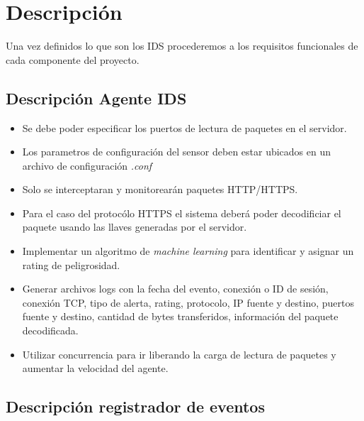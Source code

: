 \section{Descripción}

Una vez definidos lo que son los IDS procederemos a los requisitos funcionales de cada componente del proyecto. \\

\subsection{Descripción Agente IDS}


\begin{itemize}
    \item Se debe poder especificar los puertos de lectura de paquetes en el servidor.
    \item Los parametros de configuración del sensor deben estar ubicados en un archivo de configuración \textit{.conf}
    \item Solo se interceptaran y monitorearán paquetes HTTP/HTTPS.
    \item Para el caso del protocólo HTTPS el sistema deberá poder decodificiar el paquete usando las llaves generadas por el servidor.
    \item Implementar un algoritmo de \textit{machine learning} para identificar y asignar un rating de peligrosidad.
    \item Generar archivos logs con la fecha del evento, conexión o ID de sesión, conexión TCP, tipo de alerta, rating, protocolo, IP fuente y destino, puertos fuente y destino, cantidad de bytes transferidos, información del paquete decodificada.
    \item Utilizar concurrencia para ir liberando la carga de lectura de paquetes y aumentar la velocidad del agente.
\end{itemize}



\subsection{Descripción registrador de eventos}

